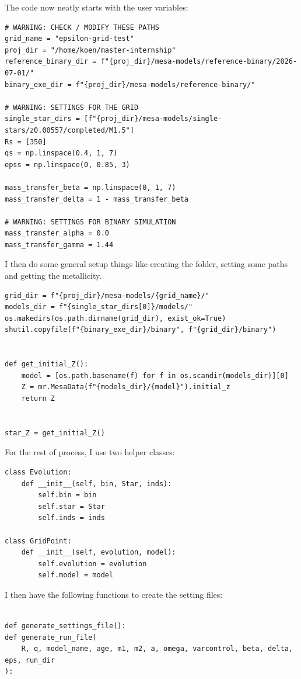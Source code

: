 \documentclass[a4paper,10pt]{article}
\begin{document}
The code now neatly starts with the user variables:
\begin{verbatim}
# WARNING: CHECK / MODIFY THESE PATHS
grid_name = "epsilon-grid-test"
proj_dir = "/home/koen/master-internship"
reference_binary_dir = f"{proj_dir}/mesa-models/reference-binary/2026-07-01/"
binary_exe_dir = f"{proj_dir}/mesa-models/reference-binary/"

# WARNING: SETTINGS FOR THE GRID
single_star_dirs = [f"{proj_dir}/mesa-models/single-stars/z0.00557/completed/M1.5"]
Rs = [350]
qs = np.linspace(0.4, 1, 7)
epss = np.linspace(0, 0.85, 3)

mass_transfer_beta = np.linspace(0, 1, 7)
mass_transfer_delta = 1 - mass_transfer_beta

# WARNING: SETTINGS FOR BINARY SIMULATION
mass_transfer_alpha = 0.0
mass_transfer_gamma = 1.44
\end{verbatim}
I then do some general setup things like creating the folder, setting some paths and getting the metallicity.
\begin{verbatim}
grid_dir = f"{proj_dir}/mesa-models/{grid_name}/"
models_dir = f"{single_star_dirs[0]}/models/"
os.makedirs(os.path.dirname(grid_dir), exist_ok=True)
shutil.copyfile(f"{binary_exe_dir}/binary", f"{grid_dir}/binary")


def get_initial_Z():
    model = [os.path.basename(f) for f in os.scandir(models_dir)][0]
    Z = mr.MesaData(f"{models_dir}/{model}").initial_z
    return Z


star_Z = get_initial_Z()
\end{verbatim}

For the rest of process, I use two helper classes:
\begin{verbatim}
class Evolution:
    def __init__(self, bin, Star, inds):
        self.bin = bin
        self.star = Star
        self.inds = inds

class GridPoint:
    def __init__(self, evolution, model):
        self.evolution = evolution
        self.model = model
\end{verbatim}

I then have the following functions to create the setting files:
\begin{verbatim}

def generate_settings_file():
def generate_run_file(
    R, q, model_name, age, m1, m2, a, omega, varcontrol, beta, delta, eps, run_dir
):
\end{verbatim}
\end{document}
